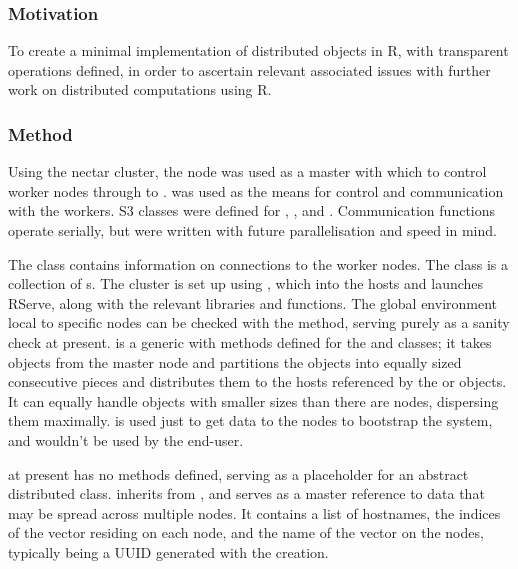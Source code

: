 \subsubsection{Motivation}\label{motivation}

To create a minimal implementation of distributed objects in R, with
transparent operations defined, in order to ascertain relevant
associated issues with further work on distributed computations using R.

\subsubsection{Method}\label{method}

Using the nectar cluster, the  node was used as a master
with which to control worker nodes  through to
.  was used as the means for control and
communication with the workers. S3 classes were defined for
, ,  and
. Communication functions operate serially,
but were written with future parallelisation and speed in mind.

The  class contains information on connections to the
worker nodes. The  class is a collection of
s. The cluster is set up using ,
which  into the hosts and launches RServe, along with the
relevant libraries and functions. The global environment local to
specific nodes can be checked with the  method, serving
purely as a sanity check at present.  is a generic with
methods defined for the  and  classes; it
takes objects from the master node and partitions the objects into
equally sized consecutive pieces and distributes them to the hosts
referenced by the  or  objects. It can
equally handle objects with smaller  sizes than there are
nodes, dispersing them maximally.  is used just to get
data to the nodes to bootstrap the system, and wouldn't be used by the
end-user.

 at present has no methods defined, serving
as a placeholder for an abstract distributed class.
 inherits from ,
and serves as a master reference to data that may be spread across
multiple nodes. It contains a list of hostnames, the indices of the
vector residing on each node, and the name of the vector on the nodes,
typically being a UUID generated with the 
creation.

